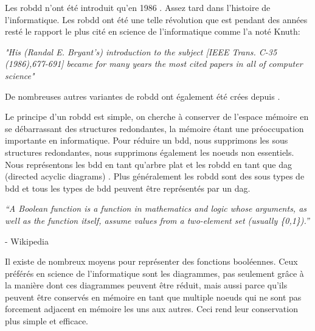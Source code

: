 \documentclass[french]{article}
\begin{document}
Les robdd n'ont été introduit qu'en 1986 \cite{bryant_graph}. Assez tard dans l'histoire de l'informatique. Les robdd ont été une telle révolution que \cite{bryant_graph} est pendant des années resté le rapport le plus cité en science de l'informatique comme l'a noté Knuth:

\begin{center}
    \emph{"His (Randal E. Bryant's) introduction to the subject [IEEE Trans. C-35 (1986),677-691] became for many years the most cited papers in all of computer science"}\cite{knuth}
\end{center}

De nombreuses autres variantes de robdd ont également été crées depuis \cite{wegner}.\medskip

Le principe d'un robdd est simple, on cherche à conserver de l'espace mémoire en se débarrassant des structures redondantes, la mémoire étant une préoccupation importante en informatique. Pour réduire un bdd, nous supprimons les sous structures redondantes, nous supprimons également les noeuds non essentiels. Nous représentons les bdd en tant qu'arbre plat et les robdd en tant que dag (directed acyclic diagrams) \cite{flajolet_automata}. Plus généralement les robdd sont des sous types de bdd et tous les types de bdd peuvent être représentés par un dag.\medskip

\begin{center}
\emph{“A Boolean function is a function in mathematics and logic whose arguments, as well as the function itself, assume values from a two-element set (usually \{0,1\}).”} 
\end{center}

- Wikipedia 
\vspace{5mm} 

Il existe de nombreux moyens pour représenter des fonctions booléennes. Ceux préférés en science de l'informatique sont les diagrammes, pas seulement grâce à la manière dont ces diagrammes peuvent être réduit, mais aussi parce qu'ils peuvent être conservés en mémoire en tant que multiple noeuds qui ne sont pas forcement adjacent en mémoire les uns aux autres. Ceci rend leur conservation plus simple et efficace.
\end{document}
